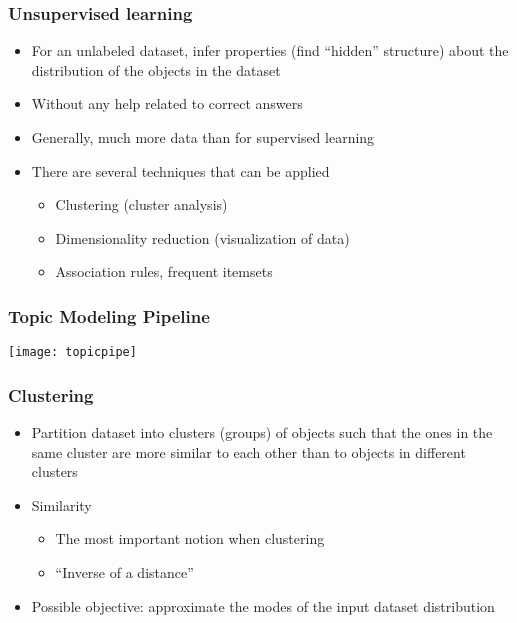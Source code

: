 \begin{frame}[fragile]\frametitle{Unsupervised learning}
  \begin{itemize}
    \item  For an unlabeled dataset, infer properties (find ``hidden'' structure) about the distribution of the objects in the dataset 
    \item  Without any help related to correct answers

    \item Generally, much more data than for supervised learning
        \item There are several techniques that can be applied
      \begin{itemize}
    \item Clustering (cluster analysis)
    \item Dimensionality reduction (visualization of data)
    \item Association rules, frequent itemsets
      \end{itemize}

  \end{itemize}
\end{frame}

\begin{frame}[fragile]\frametitle{Topic Modeling Pipeline}
\begin{center}
\texttt{[image: topicpipe]}
\end{center}
\end{frame}


\begin{frame}[fragile]\frametitle{Clustering}
  \begin{itemize}
    \item  Partition dataset into clusters (groups) of objects such that the ones in the same cluster are more similar to each other than to objects in different clusters
    \item Similarity
      \begin{itemize}
    \item The most important notion when clustering
    \item ``Inverse of a distance''
      \end{itemize}
	\item Possible objective: approximate the modes of the input dataset distribution
  \end{itemize}
\end{frame}


